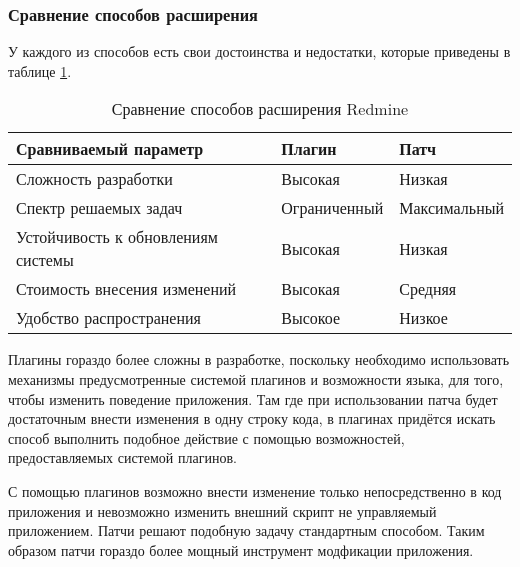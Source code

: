 \subsubsection{Сравнение способов расширения}
У каждого из способов есть свои достоинства и недостатки, которые приведены в
таблице \ref{comparing_extensions}.
\begin{table}[hb!]

\makeatletter
\def\@makecaption#1#2{
  \vskip\abovecaptionskip
  \sbox\@tempboxa{#2 #1}
  \begin{flushright}
    #1
  \end{flushright}
  \begin{center}
    \textbf{#2}
  \end{center}
  \vskip\belowcaptionskip}
\makeatother

\caption{Сравнение способов расширения Redmine}
\small
\centering
\begin{tabular}{ 
|>{\centering\arraybackslash}m{}
|>{\centering\arraybackslash}m{}
|>{\centering\arraybackslash}m{}|}
\hline
\textbf{Сравниваемый параметр} & \textbf{Плагин} & \textbf{Патч}\\
\hline
Сложность разработки & Высокая & Низкая \\
\hline
Спектр решаемых задач & Ограниченный & Максимальный\\
\hline
Устойчивость к обновлениям системы & Высокая & Низкая \\
\hline
Стоимость внесения изменений & Высокая & Средняя \\
\hline
Удобство распространения & Высокое & Низкое \\
\hline
\end{tabular}

\label{comparing_extensions}
\end{table}

Плагины гораздо более сложны в разработке, поскольку необходимо использовать
механизмы предусмотренные системой плагинов и возможности языка, для того,
чтобы изменить поведение приложения. Там где при использовании патча будет
достаточным внести изменения в одну строку кода, в плагинах придётся искать
способ выполнить подобное действие с помощью возможностей, предоставляемых
системой плагинов.

С помощью плагинов возможно внести изменение только непосредственно в код
приложения и невозможно изменить внешний скрипт не управляемый приложением.
Патчи решают подобную задачу стандартным способом. Таким образом патчи гораздо
более мощный инструмент модфикации приложения.

